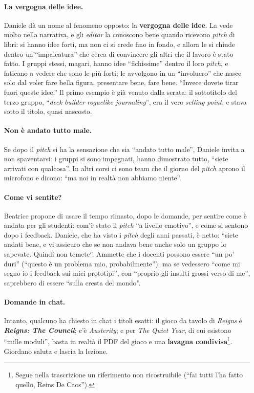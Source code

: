 \paragraph{La vergogna delle idee.} Daniele dà un nome al fenomeno opposto: la
\textbf{vergogna delle idee}. La vede molto nella narrativa, e gli \emph{editor} la
conoscono bene quando ricevono \emph{pitch} di libri: si hanno idee forti, ma non ci si
crede fino in fondo, e allora le si chiude dentro un'``impalcatura'' che cerca di
convincere gli altri che il lavoro è stato fatto. I gruppi stessi, magari, hanno idee
``fichissime'' dentro il loro \emph{pitch}, e faticano a vedere che sono le più forti; le
avvolgono in un ``involucro'' che nasce solo dal voler fare bella figura, presentare bene,
fare bene. ``Invece dovete tirar fuori queste idee.'' Il primo esempio è già venuto dalla
serata: il sottotitolo del terzo gruppo, ``\emph{deck builder roguelike journaling}'',
era il vero \emph{selling point}, e stava sotto il titolo, quasi nascosto.

\paragraph{Non è andato tutto male.} Se dopo il \emph{pitch} si ha la sensazione che sia
``andato tutto male'', Daniele invita a non spaventarsi: i gruppi si sono impegnati,
hanno dimostrato tutto, ``siete arrivati con qualcosa''. In altri corsi ci sono team che
il giorno del \emph{pitch} aprono il microfono e dicono: ``ma noi in realtà non abbiamo
niente''.

\paragraph{Come vi sentite?} Beatrice propone di usare il tempo rimasto, dopo le domande,
per sentire come è andata per gli studenti: com'è stato il \emph{pitch} ``a livello
emotivo'', e come si sentono dopo i feedback. Daniele, che ha visto i \emph{pitch} degli
anni passati, è netto: ``siete andati bene, e vi assicuro che se non andava bene anche
solo un gruppo lo sapevate. Quindi non temete''. Ammette che i docenti possono essere
``un po' duri'' (``questo è un problema mio, probabilmente''): ma se vedessero ``come mi
segno io i feedback sui miei prototipi'', con ``proprio gli insulti grossi verso di me'',
saprebbero di essere ``sulla cresta del mondo''.

\paragraph{Domande in chat.} Intanto, qualcuno ha chiesto in chat i titoli esatti: il
gioco da tavolo di \emph{Reigns} è \textbf{\emph{Reigns: The Council}}; c'è
\emph{Austerity}; e per \emph{The Quiet Year}, di cui esistono ``mille moduli'', basta in
realtà il PDF del gioco e una \textbf{lavagna condivisa}\footnote{Segue nella trascrizione
un riferimento non ricostruibile (``fai tutti l'ha fatto quello, Reins De Caos'').}.
Giordano saluta e lascia la lezione.

